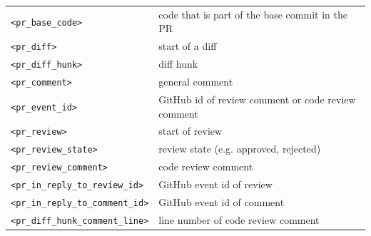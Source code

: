 \documentclass[10pt]{article} %
\begin{document}
\begin{table}[t]
\begin{tabular}{ll}
    \verb|<pr_base_code>| & code that is part of the base commit in the PR\\
    \verb|<pr_diff>| & start of a diff\\
    \verb|<pr_diff_hunk>| & diff hunk\\
    \verb|<pr_comment>| & general comment\\
    \verb|<pr_event_id>| & GitHub id of review comment or code review comment\\
    \verb|<pr_review>| & start of review\\
    \verb|<pr_review_state>| & review state (e.g. approved, rejected) \\
    \verb|<pr_review_comment>| & code review comment\\
    \verb|<pr_in_reply_to_review_id>| & GitHub event id of review \\
    \verb|<pr_in_reply_to_comment_id>| &  GitHub event id of comment \\
    \verb|<pr_diff_hunk_comment_line>| & line number of code review comment \\

    \bottomrule
    \end{tabular}
\end{table}
\end{document}
